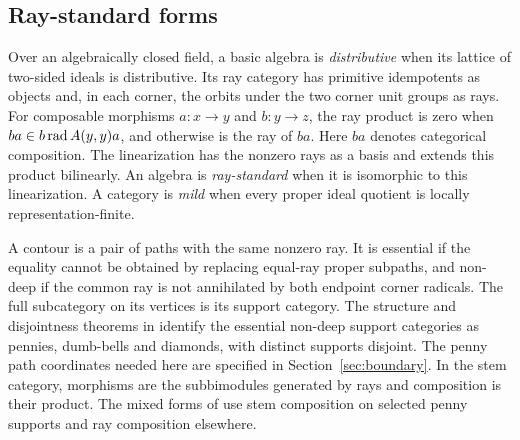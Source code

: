 \subsection{Ray-standard forms}
Over an algebraically closed field, a basic algebra is \emph{distributive} when its lattice of two-sided ideals is distributive. Its ray category has primitive idempotents as objects and, in each corner, the orbits under the two corner unit groups as rays. For composable morphisms $a:x\to y$ and $b:y\to z$, the ray product is zero when $ba\in b\operatorname{rad} A(y,y)a$, and otherwise is the ray of $ba$. Here $ba$ denotes categorical composition. The linearization has the nonzero rays as a basis and extends this product bilinearly. An algebra is \emph{ray-standard} when it is isomorphic to this linearization. A category is \emph{mild} when every proper ideal quotient is locally representation-finite.

A contour is a pair of paths with the same nonzero ray. It is essential if the equality cannot be obtained by replacing equal-ray proper subpaths, and non-deep if the common ray is not annihilated by both endpoint corner radicals. The full subcategory on its vertices is its support category. The structure and disjointness theorems in \cite[Theorem 6]{Bongartz13} identify the essential non-deep support categories as pennies, dumb-bells and diamonds, with distinct supports disjoint. The penny path coordinates needed here are specified in Section~\ref{sec:boundary}. In the stem category, morphisms are the subbimodules generated by rays and composition is their product. The mixed forms of \cite[Theorem 10]{Bongartz13} use stem composition on selected penny supports and ray composition elsewhere.

